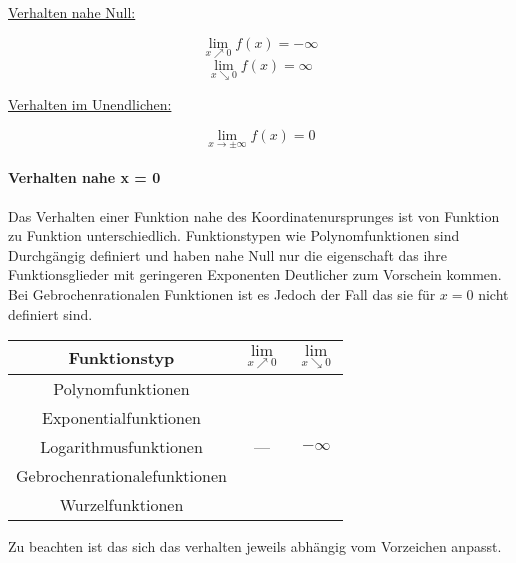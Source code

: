 \documentclass{article}
\begin{document}
		\begin{multicols}{2}
		
		
		\underline{Verhalten nahe Null:}
		
		\[\lim\limits_{x \nearrow 0} f(x) = - \infty\]
		\[\lim\limits_{x \searrow 0} f(x) =  \infty\]
		
		\underline{Verhalten im Unendlichen:}
		
		\[\lim\limits_{x \rightarrow \pm \infty} f(x) = 0\]
		
		\end{multicols}
				
		\paragraph{Verhalten nahe x = 0}\label{Verhalten nahe Null}
			Das Verhalten einer Funktion nahe des Koordinatenursprunges ist von Funktion zu Funktion unterschiedlich. Funktionstypen wie Polynomfunktionen sind Durchgängig definiert und haben nahe Null nur die eigenschaft das ihre Funktionsglieder mit geringeren Exponenten Deutlicher zum Vorschein kommen. Bei Gebrochenrationalen Funktionen ist es Jedoch der Fall das sie für $x = 0$ nicht definiert sind.\\
			
		\begin{tabular}{|c|c|c|}
			\hline 
			Funktionstyp & $\lim\limits_{x \nearrow 0}$& $\lim\limits_{x \searrow 0}$ \\
			\hline
			Polynomfunktionen & & \\
			\hline
			Exponentialfunktionen & & \\
			\hline
			Logarithmusfunktionen & --- & $- \infty$ \\
			\hline
			Gebrochenrationalefunktionen & & \\
			\hline
			Wurzelfunktionen & & \\ 
			\hline
		\end{tabular}
		 Zu beachten ist das sich das verhalten jeweils abhängig vom Vorzeichen anpasst.
		
\end{document}
